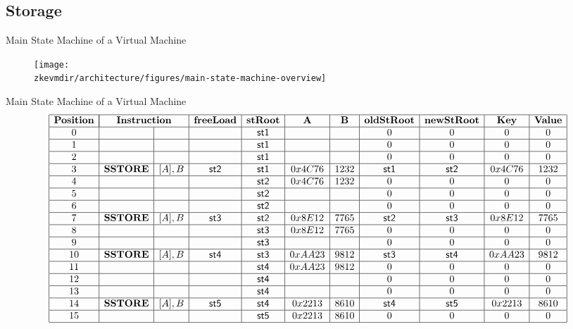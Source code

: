 \subsection{Storage}
\begin{frame}{Main State Machine of a Virtual Machine}
\begin{figure}
	\texttt{[image: \\zkevmdir/architecture/figures/main-state-machine-overview]}
\end{figure}
\end{frame}







\begin{frame}{Main State Machine of a Virtual Machine}
\scriptsize
\[
\begin{array}{|c|l|c|c|c|c|c|c|c|c|c|c|}
\hline
\mathbf{Position} & \multicolumn{2}{|c|}{\mathbf{Instruction}} & \mathbf{freeLoad} & \mathbf{stRoot} & \mathbf{A} & \mathbf{B} & \mathbf{oldStRoot} & \mathbf{newStRoot} & \mathbf{Key} & \mathbf{Value} \\ \hline
0 &  &  &  & \mathsf{st1} &  &  & 0 & 0 & 0 & 0 \\ \hline
1 &  &  &  & \mathsf{st1} &  &  & 0 & 0 & 0 & 0 \\ \hline
2 &  &  &  & \mathsf{st1} &  &  & 0 & 0 & 0 & 0 \\ \hline
3 & \mathbf{SSTORE} & [A], B & \mathsf{st2} & \mathsf{st1} & 0x4C76 & 1232 & \mathsf{st1} & \mathsf{st2} & 0x4C76 & 1232 \\ \hline
4 &  &  &  & \mathsf{st2} & 0x4C76 & 1232 & 0 & 0 & 0 & 0 \\ \hline
5 &  &  &  & \mathsf{st2} &  &  & 0 & 0 & 0 & 0 \\ \hline
6 &  &  &  & \mathsf{st2} &  &  & 0 & 0 & 0 & 0 \\ \hline
7 & \mathbf{SSTORE} & [A], B & \mathsf{st3} & \mathsf{st2} & 0x8E12 & 7765 & \mathsf{st2} & \mathsf{st3} & 0x8E12 & 7765 \\ \hline
8 &  &  &  & \mathsf{st3} & 0x8E12 & 7765 & 0 & 0 & 0 & 0 \\ \hline
9 &  &  &  & \mathsf{st3} &  &  & 0 & 0 & 0 & 0 \\ \hline
10 & \mathbf{SSTORE} & [A], B & \mathsf{st4} & \mathsf{st3} & 0xAA23 & 9812 & \mathsf{st3} & \mathsf{st4} & 0xAA23 & 9812 \\ \hline
11 &  &  &  & \mathsf{st4} & 0xAA23 & 9812 & 0 & 0 & 0 & 0 \\ \hline
12 &  &  &  & \mathsf{st4} &  &  & 0 & 0 & 0 & 0 \\ \hline
13 &  &  &  & \mathsf{st4} &  &  & 0 & 0 & 0 & 0 \\ \hline
14 & \mathbf{SSTORE} & [A], B & \mathsf{st5} & \mathsf{st4} & 0x2213 & 8610 & \mathsf{st4} & \mathsf{st5} & 0x2213 & 8610 \\ \hline
15 &  &  &  & \mathsf{st5} & 0x2213 & 8610 & 0 & 0 & 0 & 0 \\ \hline
\end{array}
\]
\end{frame}







